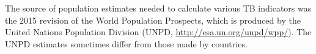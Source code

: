 The source of population estimates needed to calculate various TB indicators was the 2015 revision of the World Population Prospects, which is produced by the United Nations Population Division (UNPD, \url{http://esa.un.org/unpd/wpp/}).  The UNPD estimates sometimes differ from those made by countries. 
 
